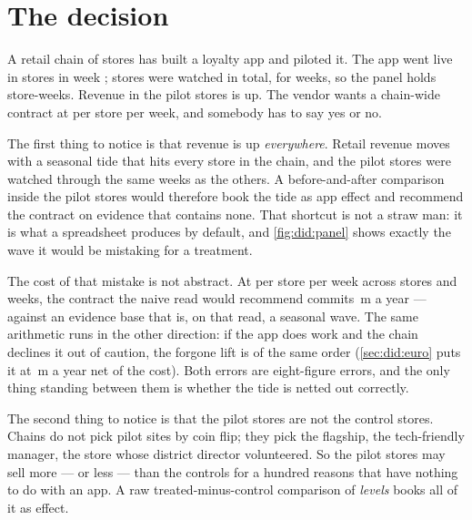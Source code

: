 \section{The decision}
\label{sec:did:decision}

A retail chain of \nbEightNChain{} stores has built a loyalty app and piloted it. The app went
live in \nbEightNTreated{} stores in week \nbEightLaunch; \nbEightNStores{} stores were watched in
total, for \nbEightNWeeks{} weeks, so the panel holds \nbEightNObs{} store-weeks. Revenue in the
pilot stores is up. The vendor wants a chain-wide contract at \eur{\nbEightAppCost} per store per
week, and somebody has to say yes or no.

The first thing to notice is that revenue is up \emph{everywhere}. Retail revenue moves with a
seasonal tide that hits every store in the chain, and the pilot stores were watched through the
same weeks as the others. A before-and-after comparison inside the pilot stores would therefore
book the tide as app effect and recommend the contract on evidence that contains none. That
shortcut is not a straw man: it is what a spreadsheet produces by default, and
\cref{fig:did:panel} shows exactly the wave it would be mistaking for a treatment.

The cost of that mistake is not abstract. At \eur{\nbEightAppCost} per store per week across
\nbEightNChain{} stores and \nbEightWeeksYear{} weeks, the contract the naive read would recommend
commits \eur{\nbEightContractAnnualM}\,m a year --- against an evidence base that is, on that read,
a seasonal wave. The same arithmetic runs in the other direction: if the app does work and the
chain declines it out of caution, the forgone lift is of the same order (\cref{sec:did:euro} puts
it at \eur{\nbEightAnnualMeanM}\,m a year net of the cost). Both errors are eight-figure errors, and
the only thing standing between them is whether the tide is netted out correctly.

The second thing to notice is that the pilot stores are not the control stores. Chains do not pick
pilot sites by coin flip; they pick the flagship, the tech-friendly manager, the store whose
district director volunteered. So the pilot stores may sell more --- or less --- than the controls
for a hundred reasons that have nothing to do with an app. A raw treated-minus-control comparison
of \emph{levels} books all of it as effect.

